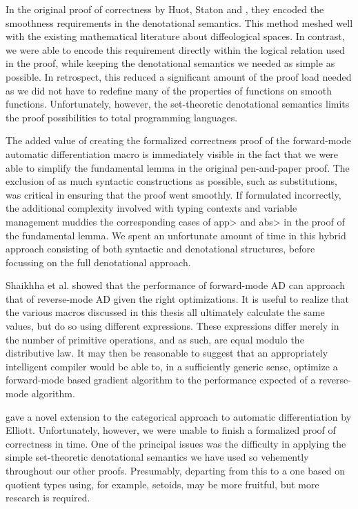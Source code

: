 In the original proof of correctness by Huot, Staton and \Vakar{}\cite{huot2020correctness}, they encoded the smoothness requirements in the denotational semantics.
This method meshed well with the existing mathematical literature about diffeological spaces.
In contrast, we were able to encode this requirement directly within the logical relation used in the proof, while keeping the denotational semantics we needed as simple as possible.
In retrospect, this reduced a significant amount of the proof load needed as we did not have to redefine many of the properties of functions on smooth functions.
Unfortunately, however, the set-theoretic denotational semantics limits the proof possibilities to total programming languages.

The added value of creating the formalized correctness proof of the forward-mode automatic differentiation macro is immediately visible in the fact that we were able to simplify the fundamental lemma in the original pen-and-paper proof.
The exclusion of as much syntactic constructions as possible, such as substitutions, was critical in ensuring that the proof went smoothly.
If formulated incorrectly, the additional complexity involved with typing contexts and variable management muddies the corresponding cases of \<app> and \<abs> in the proof of the fundamental lemma.
We spent an unfortunate amount of time in this hybrid approach consisting of both syntactic and denotational structures, before focussing on the full denotational approach.

Shaikhha et al.\cite{Shaikha2019} showed that the performance of forward-mode AD can approach that of reverse-mode AD given the right optimizations.
It is useful to realize that the various macros discussed in this thesis all ultimately calculate the same values, but do so using different expressions.
These expressions differ merely in the number of primitive operations, and as such, are equal modulo the distributive law.
It may then be reasonable to suggest that an appropriately intelligent compiler would be able to, in a sufficiently generic sense, optimize a forward-mode based gradient algorithm to the performance expected of a reverse-mode algorithm.

\Vakar{}\cite{vkr2020reverse} gave a novel extension to the categorical approach to automatic differentiation by Elliott\cite{Elliott-2018-ad-icfp}.
Unfortunately, however, we were unable to finish a formalized proof of correctness in time.
One of the principal issues was the difficulty in applying the simple set-theoretic denotational semantics we have used so vehemently throughout our other proofs.
Presumably, departing from this to a one based on quotient types using, for example, setoids, may be more fruitful, but more research is required.
